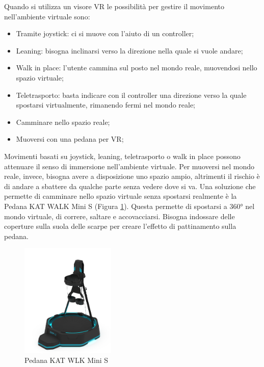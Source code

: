 \documentclass[target=bach,aauheader=]{thud}
\begin{document}
\newpage
Quando si utilizza un visore VR le possibilità per gestire il movimento nell'ambiente virtuale sono:
\begin{itemize}
    \item Tramite joystick: ci si muove con l'aiuto di un controller;
    \item Leaning: bisogna inclinarsi verso la direzione nella quale si vuole andare;
    \item Walk in place: l'utente cammina sul posto nel mondo reale, muovendosi nello spazio virtuale;
    \item Teletrasporto: basta indicare con il controller una direzione verso la quale spostarsi virtualmente, rimanendo fermi nel mondo reale;
    \item Camminare nello spazio reale;
    \item Muoversi con una pedana per VR;
\end{itemize} 

Movimenti basati su joystick, leaning, teletrasporto o walk in place possono attenuare il senso di immersione nell'ambiente virtuale.
Per muoversi nel mondo reale, invece, bisogna avere a disposizione uno spazio ampio, altrimenti il rischio è di andare a sbattere da qualche parte senza vedere dove si va.
Una soluzione che permette di camminare nello spazio virtuale senza spostarsi realmente è la Pedana KAT WALK Mini S (Figura \ref{fig:kat_walk}).
Questa permette di spostarsi a 360° nel mondo virtuale, di correre, saltare e accovacciarsi. 
Bisogna indossare delle coperture sulla suola delle scarpe per creare l'effetto di pattinamento sulla pedana.    

\begin{figure}[h]
    \centering
    \includegraphics[width=0.40\textwidth]{kat_walk_mini}
    \caption{Pedana KAT WLK Mini S}
    \label{fig:kat_walk}
\end{figure}
\end{document}
